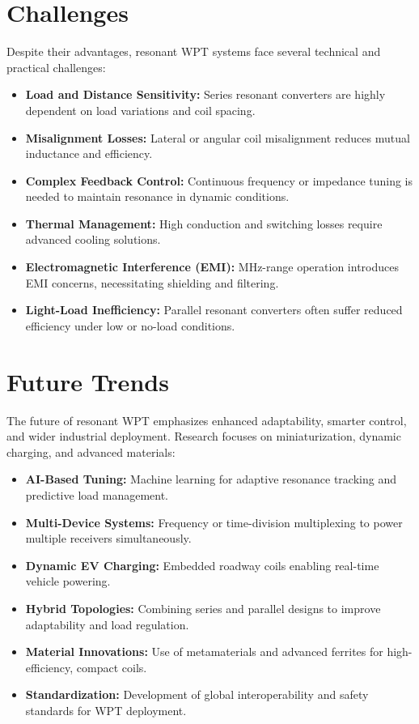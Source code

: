 \documentclass[12pt,a4paper]{report}
\begin{document}
\section{Challenges}

Despite their advantages, resonant WPT systems face several technical and practical challenges:  
\begin{itemize}
    \item \textbf{Load and Distance Sensitivity:} Series resonant converters are highly dependent on load variations and coil spacing.  
    \item \textbf{Misalignment Losses:} Lateral or angular coil misalignment reduces mutual inductance and efficiency.  
    \item \textbf{Complex Feedback Control:} Continuous frequency or impedance tuning is needed to maintain resonance in dynamic conditions.  
    \item \textbf{Thermal Management:} High conduction and switching losses require advanced cooling solutions.  
    \item \textbf{Electromagnetic Interference (EMI):} MHz-range operation introduces EMI concerns, necessitating shielding and filtering.  
    \item \textbf{Light-Load Inefficiency:} Parallel resonant converters often suffer reduced efficiency under low or no-load conditions.  
\end{itemize}

\section{Future Trends}

The future of resonant WPT emphasizes enhanced adaptability, smarter control, and wider industrial deployment. Research focuses on miniaturization, dynamic charging, and advanced materials:  
\begin{itemize}
    \item \textbf{AI-Based Tuning:} Machine learning for adaptive resonance tracking and predictive load management.  
    \item \textbf{Multi-Device Systems:} Frequency or time-division multiplexing to power multiple receivers simultaneously.   
    \item \textbf{Dynamic EV Charging:} Embedded roadway coils enabling real-time vehicle powering.  
    \item \textbf{Hybrid Topologies:} Combining series and parallel designs to improve adaptability and load regulation.  
    \item \textbf{Material Innovations:} Use of metamaterials and advanced ferrites for high-efficiency, compact coils.  
    \item \textbf{Standardization:} Development of global interoperability and safety standards for WPT deployment.  
\end{itemize}
\end{document}
